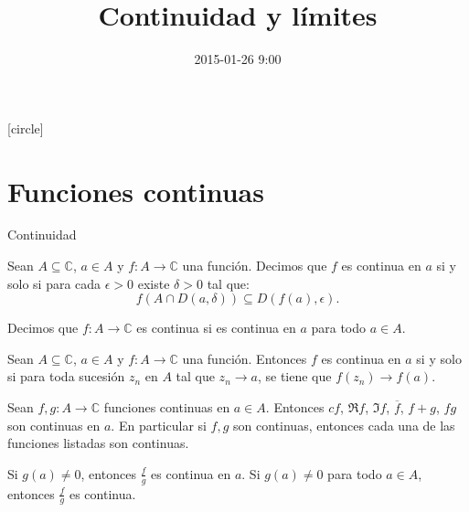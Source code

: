 \documentclass[spanish,presentation]{beamer}
\date{2015-01-26 9:00}
\title{Continuidad y límites}
\begin{document}
\maketitle
{}
[circle]

\tableofcontents

\section{Funciones continuas}
\label{sec-1}

\begin{frame}[label=sec-1-1]{Continuidad}
\begin{definition}
Sean \(A\subseteq \mathbb{C}\), \(a\in A\) y \(f\colon A\to
    \mathbb{C}\) una función. Decimos que \(f\) es \alert{continua en
\(a\)} si y solo si para cada \(\epsilon>0\) existe
\(\delta>0\) tal que:
\begin{displaymath}
f(A\cap D(a,\delta))\subseteq D(f(a),\epsilon).
\end{displaymath}
\end{definition}

\begin{block}{}
Decimos que \(f\colon A\to \mathbb{C}\) es \alert{continua} si es continua
en \(a\) para todo \(a\in A\).
\end{block}

\begin{theorem}
Sean \(A\subseteq \mathbb{C}\), \(a\in A\) y \(f\colon A\to
    \mathbb{C}\) una función. Entonces \(f\) es continua en \(a\)
si y solo si para toda sucesión \(z_{n}\) en \(A\) tal que
\(z_{n}\to a\), se tiene que \(f(z_{n})\to f(a)\).
\end{theorem}
\end{frame}

\begin{frame}[label=sec-1-2]{}
\begin{theorem}
Sean \(f,g\colon A\to \mathbb{C}\) funciones continuas en \(a\in
    A\). Entonces \(cf\), \(\Re f\), \(\Im f\), \(\overline{f}\),
\(f+g\), \(fg\) son continuas en \(a\). En particular si \(f,g\) son
continuas, entonces cada una de las funciones listadas son
continuas.
\end{theorem}

\begin{theorem}
Si \(g(a)\ne 0\), entonces \(\frac{f}{g}\) es continua en
\(a\). Si \(g(a)\ne 0\) para todo \(a\in A\), entonces
\(\frac{f}{g}\) es continua. 
\end{theorem}
\end{frame}
\end{document}

